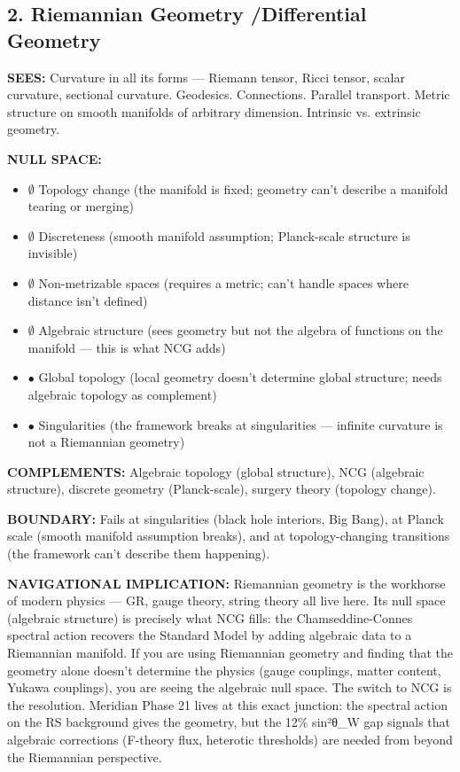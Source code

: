\bigskip\noindent\makebox[\textwidth]{\color{rulegray}\rule{5cm}{0.3pt}}\bigskip


\subsection*{2. Riemannian Geometry /\allowbreak  Differential Geometry}


\textbf{SEES:} Curvature in all its forms — Riemann tensor, Ricci tensor, scalar curvature, sectional curvature. Geodesics. Connections. Parallel transport. Metric structure on smooth manifolds of arbitrary dimension. Intrinsic vs. extrinsic geometry.


\textbf{NULL SPACE:}

\begin{itemize}[nosep,leftmargin=*]
  \item $\emptyset$ Topology change (the manifold is fixed; geometry can't describe a manifold tearing or merging)
  \item $\emptyset$ Discreteness (smooth manifold assumption; Planck-scale structure is invisible)
  \item $\emptyset$ Non-metrizable spaces (requires a metric; can't handle spaces where distance isn't defined)
  \item $\emptyset$ Algebraic structure (sees geometry but not the algebra of functions on the manifold — this is what NCG adds)
  \item $\bullet$ Global topology (local geometry doesn't determine global structure; needs algebraic topology as complement)
  \item $\bullet$ Singularities (the framework breaks at singularities — infinite curvature is not a Riemannian geometry)
\end{itemize}


\textbf{COMPLEMENTS:} Algebraic topology (global structure), NCG (algebraic structure), discrete geometry (Planck-scale), surgery theory (topology change).


\textbf{BOUNDARY:} Fails at singularities (black hole interiors, Big Bang), at Planck scale (smooth manifold assumption breaks), and at topology-changing transitions (the framework can't describe them happening).


\textbf{NAVIGATIONAL IMPLICATION:} Riemannian geometry is the workhorse of modern physics — GR, gauge theory, string theory all live here. Its null space (algebraic structure) is precisely what NCG fills: the Chamseddine-Connes spectral action recovers the Standard Model by adding algebraic data to a Riemannian manifold. If you are using Riemannian geometry and finding that the geometry alone doesn't determine the physics (gauge couplings, matter content, Yukawa couplings), you are seeing the algebraic null space. The switch to NCG is the resolution. Meridian Phase 21 lives at this exact junction: the spectral action on the RS background gives the geometry, but the 12\% sin²θ\_W gap signals that algebraic corrections (F-theory flux, heterotic thresholds) are needed from beyond the Riemannian perspective.



